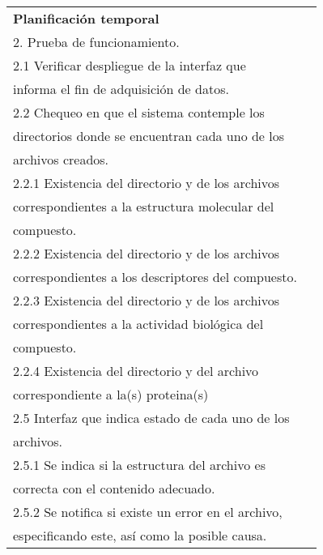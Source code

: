 \begin{longtable}{|l|l|}
\textbf{Planificación temporal}                                                        & \begin{tabular}[c]{@{}l@{}}1. Prueba de compilación.\\ 2. Prueba de funcionamiento.\\ 2.1 Verificar despliegue de la interfaz que \\ informa el fin de adquisición de datos.\\ 2.2 Chequeo en que el sistema contemple los \\ directorios donde se encuentran cada uno de los \\ archivos creados.\\ 2.2.1 Existencia del directorio y de los archivos\\ correspondientes a la estructura molecular del \\ compuesto.\\ 2.2.2 Existencia del directorio y de los archivos\\ correspondientes a los descriptores del compuesto.\\ 2.2.3 Existencia del directorio y de los archivos\\ correspondientes a la actividad biológica del \\ compuesto.\\ 2.2.4 Existencia del directorio y del archivo \\ correspondiente a la(s) proteina(s)\\ 2.5 Interfaz que indica estado de cada uno de los \\ archivos.\\ 2.5.1 Se indica si la estructura del archivo es \\ correcta con el contenido adecuado.\\ 2.5.2 Se notifica si existe un error en el archivo,\\ especificando este, así como la posible causa.\end{tabular} \\ \hline

\end{longtable}
